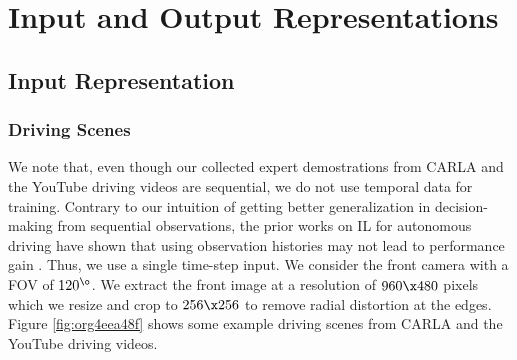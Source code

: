 \documentclass[letterpaper, 12pt]{book}
\theoremstyle{definition}
\theoremstyle{definition}
\theoremstyle{definition}
\theoremstyle{definition}
\theoremstyle{definition}
\begin{document}
\section{Input and Output Representations}
\label{sec:org4a1e2cd}

\subsection{Input Representation}
\label{sec:orgd67c629}

\subsubsection{Driving Scenes}
\label{sec:orgcd7c774}
We note that, even though our collected expert demostrations from CARLA and the
YouTube driving videos are sequential, we do not use temporal data for
training. Contrary to our intuition of getting better generalization in
decision-making from sequential observations, the prior works on IL for
autonomous driving have shown that using observation histories may not lead to
performance gain \cite{Haan2019,Muller2006,Bansal2018,Wang2019a}. Thus, we use a
single time-step input. We consider the front camera with a FOV of
\(120^{\o}\). We extract the front image at a resolution of \(960 \x 480\)
pixels which we resize and crop to \(256 \x 256\) to remove radial distortion at
the edges. Figure \ref{fig:org4eea48f} shows some example driving scenes from CARLA
and the YouTube driving videos.
\end{document}
